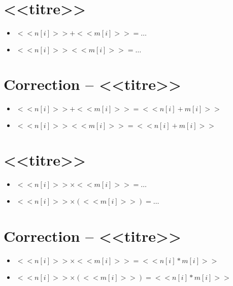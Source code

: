 \section{<<titre>>}
\begin{itemize}

<<[1,2,3]|random()>>

  \item $<<n[i]>>+<<m[i]>>=\ldots$
  \item $<<n[i]>><<m[i]>>=\ldots$	
\end{itemize}

\section{Correction -- <<titre>>}
\begin{itemize}

  \item $<<n[i]>>+<<m[i]>>=<<n[i]+m[i]>>$
  \item $<<n[i]>><<m[i]>>=<<n[i]+m[i]>>$	
\end{itemize}


\section{<<titre>>}
\begin{itemize}

  \item $<<n[i]>>\times<<m[i]>>=\ldots$
  \item $<<n[i]>>\times(<<m[i]>>)=\ldots$	
\end{itemize}

\section{Correction -- <<titre>>}
\begin{itemize}

  \item $<<n[i]>>\times<<m[i]>>=<<n[i]*m[i]>>$
  \item $<<n[i]>>\times(<<m[i]>>)=<<n[i]*m[i]>>$	
\end{itemize}